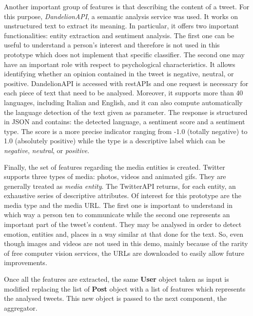 Another important group of features is that describing the content of a tweet. For this purpose, \textit{DandelionAPI}, a semantic analysis service was used. It works on unstructured text to extract its meaning. 
In particular, it offers two important functionalities: entity extraction and sentiment analysis.
The first one can be useful to understand a person's interest and therefore is not used in this prototype which does not implement that specific classifier.
The second one may have an important role with respect to psychological characteristics.
It allows identifying whether an opinion contained in the tweet is negative, neutral, or positive. 
DandelionAPI is accessed with restAPIs and one request is necessary for each piece of text that need to be analysed. Moreover, it supports more than 40 languages, including Italian and English, and it can also compute automatically the language detection of the text given as parameter.
The response is structured in JSON and contains: the detected language, a sentiment score and a sentiment type.
The score is a more precise indicator ranging from -1.0 (totally negative) to 1.0 (absolutely positive) while the type is a descriptive label which can be \textit{negative}, \textit{neutral}, or \textit{positive}. 

Finally, the set of features regarding the media entities is created. Twitter supports three types of media: photos, videos and animated gifs. They are generally treated as \textit{media entity}.
The TwitterAPI returns, for each entity, an exhaustive series of descriptive attributes. Of interest for this prototype are the media type and the media URL.
The first one is important to understand in which way a person ten to communicate while the second one represents an important part of the tweet's content.
They may be analysed in order to detect emotion, entities and, places in a way similar at that done for the text.
So, even though images and videos are not used in this demo, mainly because of the rarity of free computer vision services, the URLs are downloaded to easily allow future improvements.

Once all the features are extracted, the same \textbf{User} object taken as input is modified replacing the list of \textbf{Post} object with a list of features which represents the analysed tweets.
This new object is passed to the next component, the aggregator.

